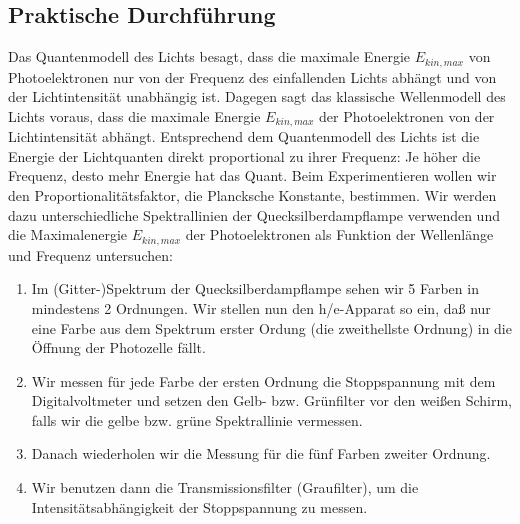 \documentclass[12px]{scrartcl}
\begin{document}
\subsection{Praktische Durchführung}
Das Quantenmodell des Lichts besagt, dass die maximale Energie $E_{kin,max}$ von Photoelektronen nur von der Frequenz des einfallenden Lichts abhängt und von der Lichtintensität unabhängig ist.
Dagegen sagt das klassische Wellenmodell des Lichts voraus, dass die maximale Energie $E_{kin,max}$ der Photoelektronen von der Lichtintensität abhängt.
Entsprechend dem Quantenmodell des Lichts ist die Energie der Lichtquanten direkt proportional zu ihrer Frequenz: Je höher die Frequenz, desto mehr Energie hat das Quant. Beim Experimentieren wollen wir den Proportionalitätsfaktor, die Plancksche Konstante, bestimmen.
Wir werden dazu unterschiedliche Spektrallinien der Quecksilberdampflampe verwenden und die Maximalenergie $E_{kin,max}$ der Photoelektronen als Funktion der Wellenlänge und Frequenz untersuchen:
\begin{enumerate}
\item Im (Gitter-)Spektrum der Quecksilberdampflampe sehen wir 5 Farben in mindestens 2 Ordnungen.
Wir stellen nun den h/e-Apparat so ein, daß nur eine Farbe aus dem Spektrum erster Ordung (die zweithellste Ordnung) in die Öffnung der Photozelle fällt.
\item Wir messen für jede Farbe der ersten Ordnung die Stoppspannung mit dem Digitalvoltmeter und setzen den
Gelb- bzw. Grünfilter vor den weißen Schirm, falls wir die gelbe bzw. grüne Spektrallinie vermessen.
\item Danach wiederholen wir die Messung für die fünf Farben zweiter Ordnung.
\item Wir benutzen dann die Transmissionsfilter (Graufilter), um die Intensitätsabhängigkeit der Stoppspannung zu messen.
\end{enumerate}
\end{document}
